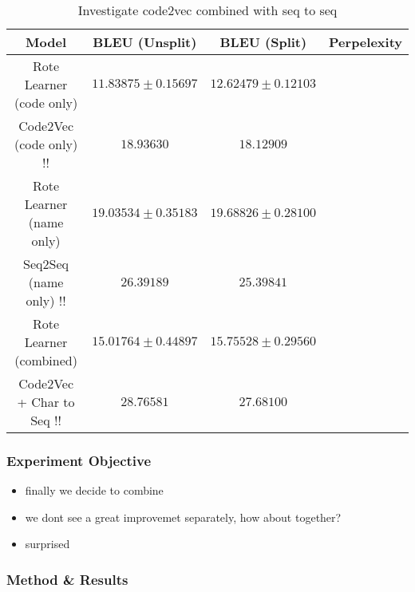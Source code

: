 \begin{table}[h!]
\begin{center}
\begin{tabular}{ c | c | c | c }
    Model                             & BLEU (Unsplit)  & BLEU (Split)    & Perpelexity \\
    \hline
    Rote Learner  (code only)        & $ 11.83875 \pm  0.15697 $ & $ 12.62479 \pm 0.12103 $ & \\
    Code2Vec  (code only)         !!    & $ 18.93630 $ & $ 18.12909 $ & \\
    \hline
    \hline
    Rote Learner  (name only)         & $ 19.03534 \pm  0.35183 $ & $ 19.68826 \pm 0.28100 $ & \\
    Seq2Seq  (name only)      !!         & $ 26.39189 $ & $ 25.39841 $ & \\
    \hline
    \hline
    Rote Learner (combined)            & $ 15.01764 \pm  0.44897 $ & $ 15.75528 \pm 0.29560 $ & \\
    Code2Vec  + Char to Seq       !!     & $ 28.76581 $ & $ 27.68100 $ & \\
    \hline
\end{tabular}
\caption {Investigate code2vec combined with seq to seq}
\label{table:code2vec_embed}
\end{center}
\end{table}

\subsubsection{Experiment Objective} %

\begin{itemize}
    \item finally we decide to combine
    \item we dont see a great improvemet separately, how about together?
    \item surprised
\end{itemize}


\subsubsection{Method \& Results} %


